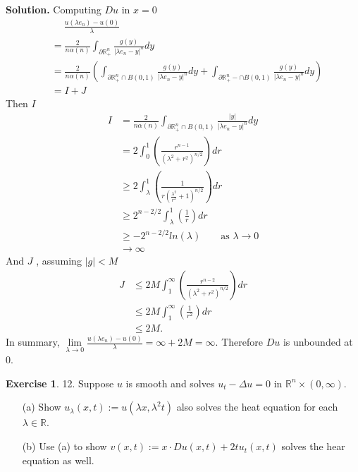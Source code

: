 \documentclass[a4paper]{book}
\newenvironment{solution}%
{\noindent\textbf{Solution.}}%
{\qedhere}
\numberwithin{equation}{chapter}
\theoremstyle{definition}
\newtheorem{exc}[exm]{Exercise}
\begin{document}
\begin{multicols}{2}
\begin{solution}
	Computing $ Du $ in $ x = 0 $ 
	\begin{align*}
		&\quad\; \frac{u(\lambda e_n) - u(0)}{\lambda} \\
		&=\frac{2}{n\alpha(n)} \int_{\partial \mathbb{R}_+^n} \frac{g(y)}{|\lambda e_n-y|^n} dy \\
		&=\frac{2}{n\alpha(n)} (\int_{\partial \mathbb{R}_+^n \cap B(0,1)} \frac{g(y)}{|\lambda e_n-y|^n} dy + \int_{\partial \mathbb{R}_+^n - \cap B(0,1)} \frac{g(y)}{|\lambda e_n-y|^n} dy) \\
		&= I + J
	\end{align*}
	Then $ I $
	\begin{align*}
		I &= \frac{2}{n \alpha(n)} \int_{\partial \mathbb{R}_+^n \cap B(0,1)} \frac{|y|}{|\lambda e_n - y|^n}dy \\ 
		&= 2 \int_{0}^{1}(\frac{r^{n-1}}{(\lambda^2 + r^2)^{n/2}}) dr\\
		&\geq 2 \int_{\lambda}^{1}(\frac{1}{r(\frac{\lambda^2}{r^2} + 1)^{n/2}}) dr \\
		&\geq 2^{n-2/2} \int_{\lambda}^{1}(\frac{1}{r}) dr \\
		&\geq -2^{n-2/2} ln(\lambda) \qquad \text{as } \lambda \rightarrow 0 \\
		& \rightarrow \infty
	\end{align*}
	And $ J $ , assuming $ |g| < M $
	\begin{align*}
		J &\leq  2M \int_{1}^{\infty}(\frac{r^{n-2}}{(\lambda^2 + r^2)^{n/2}}) dr \\
		&\leq 2M \int_{1}^{\infty}(\frac{1}{r^2}) dr \\
		&\leq 2M.
	\end{align*}
	In summary, $ \lim\limits_{\lambda \rightarrow 0}  \frac{u(\lambda e_n) - u(0)}{\lambda} = \infty + 2M = \infty $. Therefore $ Du $ is unbounded at 0.
\end{solution}

\begin{exc}
	12. Suppose $ u $ is smooth and solves $ u_t - \Delta u = 0 $ in $ \mathbb{R}^n \times (0, \infty) $.
	\begin{itemize}
		\item [(a)] Show $ u_{\lambda}(x,t) := u(\lambda x, \lambda^2 t) $ also solves the heat equation for each $ \lambda \in \mathbb{R} $.
		
		\item [(b)] Use (a) to show $ v(x,t) := x \cdot Du(x,t) + 2tu_t(x,t) $ solves the hear equation as well.
	\end{itemize}
\end{exc}


\end{multicols}
\end{document}
